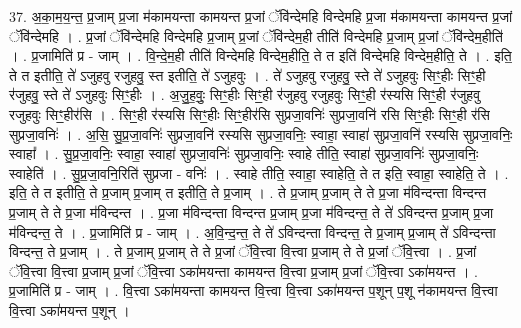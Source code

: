 \documentclass[17pt]{extarticle}
\begin{document}
37. अ॒का॒म॒य॒न्त॒ प्र॒जाम् प्र॒जा म॑कामयन्ता कामयन्त प्र॒जां ॅवि॑न्देमहि विन्देमहि प्र॒जा म॑कामयन्ता कामयन्त प्र॒जां ॅवि॑न्देमहि । . प्र॒जां ॅवि॑न्देमहि विन्देमहि प्र॒जाम् प्र॒जां ॅवि॑न्देम॒ही तीति॑ विन्देमहि प्र॒जाम् प्र॒जां ॅवि॑न्देम॒हीति॑ । . प्र॒जामिति॑ प्र - जाम् । . वि॒न्दे॒म॒ही तीति॑ विन्देमहि विन्देम॒हीति॒ ते त इति॑ विन्देमहि विन्देम॒हीति॒ ते । . इति॒ ते त इतीति॒ ते॑ ऽजुहवु रजुहवु॒ स्त इतीति॒ ते॑ ऽजुहवुः । . ते॑ ऽजुहवु रजुहवु॒ स्ते ते॑ ऽजुहवुः सिꣳ॒॒हीः सिꣳ॒॒ही र॑जुहवु॒ स्ते ते॑ ऽजुहवुः सिꣳ॒॒हीः । . अ॒जु॒ह॒वुः॒ सिꣳ॒॒हीः सिꣳ॒॒ही र॑जुहवु रजुहवुः सिꣳ॒॒ही र॑स्यसि सिꣳ॒॒ही र॑जुहवु रजुहवुः सिꣳ॒॒हीर॑सि । . सिꣳ॒॒ही र॑स्यसि सिꣳ॒॒हीः सिꣳ॒॒हीर॑सि सुप्रजा॒वनिः॑ सुप्रजा॒वनि॑ रसि सिꣳ॒॒हीः सिꣳ॒॒ही र॑सि सुप्रजा॒वनिः॑ । . अ॒सि॒ सु॒प्र॒जा॒वनिः॑ सुप्रजा॒वनि॑ रस्यसि सुप्रजा॒वनिः॒ स्वाहा॒ स्वाहा॑ सुप्रजा॒वनि॑ रस्यसि सुप्रजा॒वनिः॒ स्वाहा᳚ । . सु॒प्र॒जा॒वनिः॒ स्वाहा॒ स्वाहा॑ सुप्रजा॒वनिः॑ सुप्रजा॒वनिः॒ स्वाहे तीति॒ स्वाहा॑ सुप्रजा॒वनिः॑ सुप्रजा॒वनिः॒ स्वाहेति॑ । . सु॒प्र॒जा॒वनि॒रिति॑ सुप्रजा - वनिः॑ । . स्वाहे तीति॒ स्वाहा॒ स्वाहेति॒ ते त इति॒ स्वाहा॒ स्वाहेति॒ ते । . इति॒ ते त इतीति॒ ते प्र॒जाम् प्र॒जाम् त इतीति॒ ते प्र॒जाम् । . ते प्र॒जाम् प्र॒जाम् ते ते प्र॒जा म॑विन्दन्ता विन्दन्त प्र॒जाम् ते ते प्र॒जा म॑विन्दन्त । . प्र॒जा म॑विन्दन्ता विन्दन्त प्र॒जाम् प्र॒जा म॑विन्दन्त॒ ते ते॑ ऽविन्दन्त प्र॒जाम् प्र॒जा म॑विन्दन्त॒ ते । . प्र॒जामिति॑ प्र - जाम् । . अ॒वि॒न्द॒न्त॒ ते ते॑ ऽविन्दन्ता विन्दन्त॒ ते प्र॒जाम् प्र॒जाम् ते॑ ऽविन्दन्ता विन्दन्त॒ ते प्र॒जाम् । . ते प्र॒जाम् प्र॒जाम् ते ते प्र॒जां ॅवि॒त्त्वा वि॒त्त्वा प्र॒जाम् ते ते प्र॒जां ॅवि॒त्त्वा । . प्र॒जां ॅवि॒त्त्वा वि॒त्त्वा प्र॒जाम् प्र॒जां ॅवि॒त्त्वा ऽका॑मयन्ता कामयन्त वि॒त्त्वा प्र॒जाम् प्र॒जां ॅवि॒त्त्वा ऽका॑मयन्त । . प्र॒जामिति॑ प्र - जाम् । . वि॒त्त्वा ऽका॑मयन्ता कामयन्त वि॒त्त्वा वि॒त्त्वा ऽका॑मयन्त प॒शून् प॒शू न॑कामयन्त वि॒त्त्वा वि॒त्त्वा ऽका॑मयन्त प॒शून् । \newline
\pagebreak
{}
\end{document}
